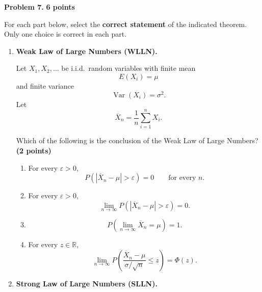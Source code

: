 \documentclass[11pt]{article}
\begin{document}
\newpage


\begin{problemheader}
\textbf{Problem 7.} \hfill \textbf{6 points}
\end{problemheader}

For each part below, select the \textbf{correct statement} of the indicated
theorem. Only one choice is correct in each part.

\begin{enumerate}[label=(\alph*),leftmargin=*,itemsep=1.2em]

\item \textbf{Weak Law of Large Numbers (WLLN).}

Let \(X_1,X_2,\ldots\) be i.i.d.\ random variables with finite mean
\[
E(X_i)=\mu
\]
and finite variance
\[
\operatorname{Var}(X_i)=\sigma^2.
\]
Let
\[
\overline X_n=\frac1n\sum_{i=1}^n X_i.
\]

Which of the following is the conclusion of the Weak Law of Large Numbers?
\hfill \textbf{(2 points)}

\begin{enumerate}[label=(\Alph*),leftmargin=2em,itemsep=0.5em]

    \item For every \(\varepsilon>0\),
    \[
    P\left(
    |\overline X_n-\mu|>\varepsilon
    \right)=0
    \qquad
    \text{for every }n.
    \]

    \item For every \(\varepsilon>0\),
    \[
    \lim_{n\to\infty}
    P\left(
    |\overline X_n-\mu|>\varepsilon
    \right)
    =0.
    \]

    \item
    \[
    P\left(
    \lim_{n\to\infty}\overline X_n=\mu
    \right)=1.
    \]

    \item For every \(z\in\mathbb R\),
    \[
    \lim_{n\to\infty}
    P\left(
    \frac{\overline X_n-\mu}{\sigma/\sqrt n}
    \leq z
    \right)
    =
    \Phi(z).
    \]

\end{enumerate}


\item \textbf{Strong Law of Large Numbers (SLLN).}


\end{enumerate}
\end{document}
